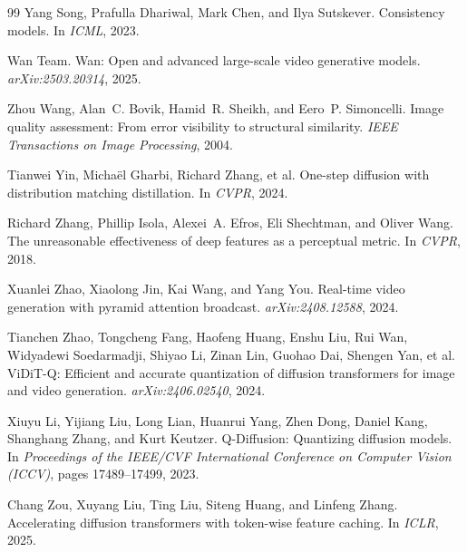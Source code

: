 \documentclass{article} %
\begin{document}
\begin{thebibliography}{99}
Yang Song, Prafulla Dhariwal, Mark Chen, and Ilya Sutskever.
\newblock Consistency models.
\newblock In \emph{ICML}, 2023.

Wan Team.
\newblock Wan: Open and advanced large-scale video generative models.
\newblock \emph{arXiv:2503.20314}, 2025.

Zhou Wang, Alan~C. Bovik, Hamid~R. Sheikh, and Eero~P. Simoncelli.
\newblock Image quality assessment: From error visibility to structural
  similarity.
\newblock \emph{IEEE Transactions on Image Processing}, 2004.

Tianwei Yin, Micha\"el Gharbi, Richard Zhang, et al.
\newblock One-step diffusion with distribution matching distillation.
\newblock In \emph{CVPR}, 2024.

Richard Zhang, Phillip Isola, Alexei~A. Efros, Eli Shechtman, and
  Oliver Wang.
\newblock The unreasonable effectiveness of deep features as a
  perceptual metric.
\newblock In \emph{CVPR}, 2018.

Xuanlei Zhao, Xiaolong Jin, Kai Wang, and Yang You.
\newblock Real-time video generation with pyramid attention broadcast.
\newblock \emph{arXiv:2408.12588}, 2024.

Tianchen Zhao, Tongcheng Fang, Haofeng Huang, Enshu Liu, Rui Wan,
Widyadewi Soedarmadji, Shiyao Li, Zinan Lin, Guohao Dai,
Shengen Yan, et al.
\newblock ViDiT-Q: Efficient and accurate quantization of diffusion
transformers for image and video generation.
\newblock \emph{arXiv:2406.02540}, 2024.

Xiuyu Li, Yijiang Liu, Long Lian, Huanrui Yang, Zhen Dong,
Daniel Kang, Shanghang Zhang, and Kurt Keutzer.
\newblock Q-Diffusion: Quantizing diffusion models.
\newblock In \emph{Proceedings of the IEEE/CVF International Conference
on Computer Vision (ICCV)}, pages 17489--17499, 2023.

Chang Zou, Xuyang Liu, Ting Liu, Siteng Huang, and Linfeng Zhang.
\newblock Accelerating diffusion transformers with token-wise feature
  caching.
\newblock In \emph{ICLR}, 2025.

\end{thebibliography}

\appendix

\end{document}
